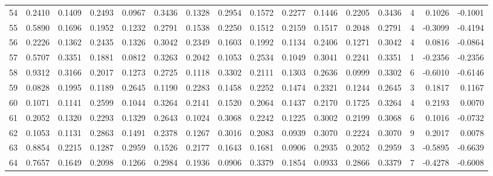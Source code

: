 \begin{tabular}{lrrrrrrrrrrrrrrr}
54  &      0.2410 &  0.1409 &  0.2493 &  0.0967 &  0.3436 &  0.1328 &  0.2954 &  0.1572 &  0.2277 &  0.1446 &   0.2205 &     0.3436 &      4 &                    0.1026 &                    -0.1001 \\
55  &      0.5890 &  0.1696 &  0.1952 &  0.1232 &  0.2791 &  0.1538 &  0.2250 &  0.1512 &  0.2159 &  0.1517 &   0.2048 &     0.2791 &      4 &                   -0.3099 &                    -0.4194 \\
56  &      0.2226 &  0.1362 &  0.2435 &  0.1326 &  0.3042 &  0.2349 &  0.1603 &  0.1992 &  0.1134 &  0.2406 &   0.1271 &     0.3042 &      4 &                    0.0816 &                    -0.0864 \\
57  &      0.5707 &  0.3351 &  0.1881 &  0.0812 &  0.3263 &  0.2042 &  0.1053 &  0.2534 &  0.1049 &  0.3041 &   0.2241 &     0.3351 &      1 &                   -0.2356 &                    -0.2356 \\
58  &      0.9312 &  0.3166 &  0.2017 &  0.1273 &  0.2725 &  0.1118 &  0.3302 &  0.2111 &  0.1303 &  0.2636 &   0.0999 &     0.3302 &      6 &                   -0.6010 &                    -0.6146 \\
59  &      0.0828 &  0.1995 &  0.1189 &  0.2645 &  0.1190 &  0.2283 &  0.1458 &  0.2252 &  0.1474 &  0.2321 &   0.1244 &     0.2645 &      3 &                    0.1817 &                     0.1167 \\
60  &      0.1071 &  0.1141 &  0.2599 &  0.1044 &  0.3264 &  0.2141 &  0.1520 &  0.2064 &  0.1437 &  0.2170 &   0.1725 &     0.3264 &      4 &                    0.2193 &                     0.0070 \\
61  &      0.2052 &  0.1320 &  0.2293 &  0.1329 &  0.2643 &  0.1024 &  0.3068 &  0.2242 &  0.1225 &  0.3002 &   0.2199 &     0.3068 &      6 &                    0.1016 &                    -0.0732 \\
62  &      0.1053 &  0.1131 &  0.2863 &  0.1491 &  0.2378 &  0.1267 &  0.3016 &  0.2083 &  0.0939 &  0.3070 &   0.2224 &     0.3070 &      9 &                    0.2017 &                     0.0078 \\
63  &      0.8854 &  0.2215 &  0.1287 &  0.2959 &  0.1526 &  0.2177 &  0.1643 &  0.1681 &  0.0906 &  0.2935 &   0.2052 &     0.2959 &      3 &                   -0.5895 &                    -0.6639 \\
64  &      0.7657 &  0.1649 &  0.2098 &  0.1266 &  0.2984 &  0.1936 &  0.0906 &  0.3379 &  0.1854 &  0.0933 &   0.2866 &     0.3379 &      7 &                   -0.4278 &                    -0.6008 \\

\end{tabular}
